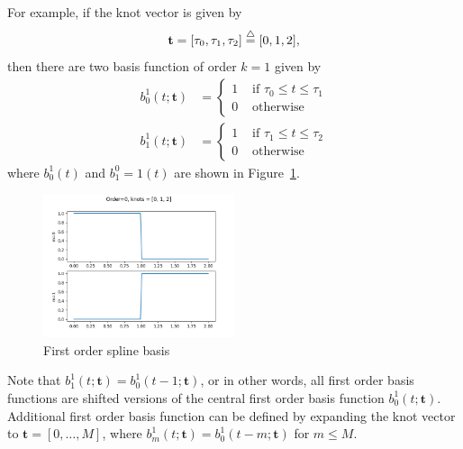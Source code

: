 For example, if the knot vector is given by
\[
\mathbf{t} = [\tau_0, \tau_1, \tau_2] \stackrel{\triangle}{=} [0, 1, 2],
\]
then there are two basis function of order $k=1$ given by
\begin{align*}
b_0^1(t; \mathbf{t}) &= \begin{cases} 1 & \text{~if~} \tau_0 \leq t \leq \tau_1 \\ 
 									 0 & \text{~otherwise} 
 			\end{cases}
\\ 
b_1^1(t; \mathbf{t}) &= \begin{cases} 1 & \text{~if~} \tau_1 \leq t \leq \tau_2 \\ 
 									 0 & \text{~otherwise}
 			\end{cases}
\end{align*}
where $b_0^1(t)$ and $b_1^0=1(t)$ are shown in Figure~\ref{fig:spline_basis_0}.
\begin{figure}[hbt]
  \centering\includegraphics[width=0.5\textwidth]{./chap5_trajectory_planning/figures/spline_basis_0}
  \caption{First order spline basis}
  \label{fig:spline_basis_0}  
\end{figure}
Note that $b_1^1(t; \mathbf{t}) = b_0^1(t-1; \mathbf{t})$, or in other words, all first order basis functions are shifted versions of the central first order basis function $b_0^1(t; \mathbf{t})$.  Additional first order basis function can be defined by expanding the knot vector to $\mathbf{t}=[0, \dots, M]$, where $b_m^1(t; \mathbf{t})= b_0^1(t-m; \mathbf{t})$ for $m\leq M$.

\clearpage


\par{}

